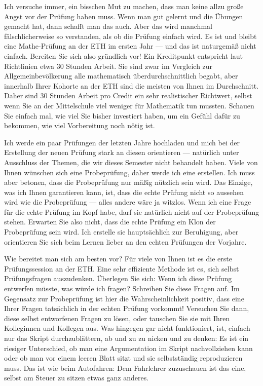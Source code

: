 \begin{spoken-clean}[01:26:29 - 01:26:54]
Ich versuche immer, ein bisschen Mut zu machen, dass man keine allzu große Angst vor der Prüfung haben muss. Wenn man gut gelernt und die Übungen gemacht hat, dann schafft man das auch. Aber das wird manchmal fälschlicherweise so verstanden, als ob die Prüfung einfach wird. Es ist und bleibt eine Mathe-Prüfung an der ETH im ersten Jahr --- und das ist naturgemäß nicht einfach. Bereiten Sie sich also gründlich vor! Ein Kreditpunkt entspricht laut Richtlinien etwa $30$ Stunden Arbeit. Sie sind zwar im Vergleich zur Allgemeinbevölkerung alle mathematisch überdurchschnittlich begabt, aber innerhalb Ihrer Kohorte an der ETH sind die meisten von Ihnen im Durchschnitt. Daher sind $30$ Stunden Arbeit pro Credit ein sehr realistischer Richtwert, selbst wenn Sie an der Mittelschule viel weniger für Mathematik tun mussten. Schauen Sie einfach mal, wie viel Sie bisher investiert haben, um ein Gefühl dafür zu bekommen, wie viel Vorbereitung noch nötig ist.

Ich werde ein paar Prüfungen der letzten Jahre hochladen und mich bei der Erstellung der neuen Prüfung stark an diesen orientieren --- natürlich unter Ausschluss der Themen, die wir dieses Semester nicht behandelt haben. Viele von Ihnen wünschen sich eine Probeprüfung, daher werde ich eine erstellen. Ich muss aber betonen, dass die Probeprüfung nur mäßig nützlich sein wird. Das Einzige, was ich Ihnen garantieren kann, ist, dass die echte Prüfung nicht so aussehen wird wie die Probeprüfung --- alles andere wäre ja witzlos. Wenn ich eine Frage für die echte Prüfung im Kopf habe, darf sie natürlich nicht auf der Probeprüfung stehen. Erwarten Sie also nicht, dass die echte Prüfung ein Klon der Probeprüfung sein wird. Ich erstelle sie hauptsächlich zur Beruhigung, aber orientieren Sie sich beim Lernen lieber an den echten Prüfungen der Vorjahre.

Wie bereitet man sich am besten vor? Für viele von Ihnen ist es die erste Prüfungssession an der ETH. Eine sehr effiziente Methode ist es, sich selbst Prüfungsfragen auszudenken. Überlegen Sie sich: Wenn ich diese Prüfung entwerfen müsste, was würde ich fragen? Schreiben Sie diese Fragen auf. Im Gegensatz zur Probeprüfung ist hier die Wahrscheinlichkeit positiv, dass eine Ihrer Fragen tatsächlich in der echten Prüfung vorkommt! Versuchen Sie dann, diese selbst entworfenen Fragen zu lösen, oder tauschen Sie sie mit Ihren Kolleginnen und Kollegen aus. Was hingegen gar nicht funktioniert, ist, einfach nur das Skript durchzublättern, ab und zu zu nicken und zu denken:  Es ist ein riesiger Unterschied, ob man eine Argumentation im Skript nachvollziehen kann oder ob man vor einem leeren Blatt sitzt und sie selbstständig reproduzieren muss. Das ist wie beim Autofahren: Dem Fahrlehrer zuzuschauen ist das eine, selbst am Steuer zu sitzen etwas ganz anderes.


\end{spoken-clean}
